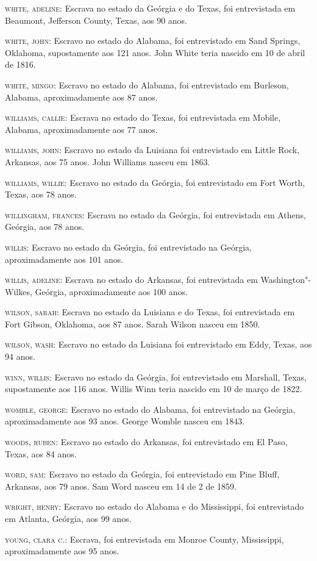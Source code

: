\begin{Parskip}
\textsc{white, adeline:} Escrava no estado da Geórgia e do Texas, foi
entrevistada em Beaumont, Jefferson County, Texas, aos 90 anos.

\textsc{white, john:} Escravo no estado do Alabama, foi entrevistado em
Sand Springs, Oklahoma, supostamente aos 121 anos. John White teria
nascido em 10 de abril de 1816.

\textsc{white, mingo:} Escravo no estado do Alabama, foi entrevistado em
Burleson, Alabama, aproximadamente aos 87 anos.

\textsc{williams, callie:} Escrava no estado do Texas, foi entrevistada
em Mobile, Alabama, aproximadamente aos 77 anos.

\textsc{williams, john:} Escravo no estado da Luisiana foi entrevistado
em Little Rock, Arkansas, aos 75 anos. John Williams nasceu em 1863.

\textsc{williams, willie:} Escravo no estado da Geórgia, foi
entrevistado em Fort Worth, Texas, aos 78 anos.

\textsc{willingham, frances:} Escrava no estado da Geórgia, foi
entrevistada em Athens, Geórgia, aos 78 anos.

\textsc{willis:} Escravo no estado da Geórgia, foi entrevistado na
Geórgia, aproximadamente aos 101 anos.

\textsc{willis, adeline:} Escrava no estado do Arkansas, foi
entrevistada em Washington"-Wilkes, Geórgia, aproximadamente aos 100
anos.

\textsc{wilson, sarah:} Escrava no estado da Luisiana e do Texas, foi
entrevistada em Fort Gibson, Oklahoma, aos 87 anos. Sarah Wilson nasceu
em 1850.

\textsc{wilson, wash:} Escravo no estado da Luisiana foi entrevistado em
Eddy, Texas, aos 94 anos.

\textsc{winn, willis:} Escravo no estado da Geórgia, foi entrevistado em
Marshall, Texas, supostamente aos 116 anos. Willis Winn teria nascido em
10 de março de 1822.

\textsc{womble, george:} Escravo no estado do Alabama, foi entrevistado
na Geórgia, aproximadamente aos 93 anos. George Womble nasceu em 1843.

\textsc{woods, ruben:} Escravo no estado do Arkansas, foi entrevistado
em El Paso, Texas, aos 84 anos.

\textsc{word, sam:} Escravo no estado da Geórgia, foi entrevistado em
Pine Bluff, Arkansas, aos 79 anos. Sam Word nasceu em 14 de 2 de 1859.

\textsc{wright, henry:} Escravo no estado do Alabama e do Mississippi,
foi entrevistado em Atlanta, Geórgia, aos 99 anos.

\textsc{young, clara c.:} Escrava, foi entrevistada em Monroe County,
Mississippi, aproximadamente aos 95 anos.
\end{Parskip}